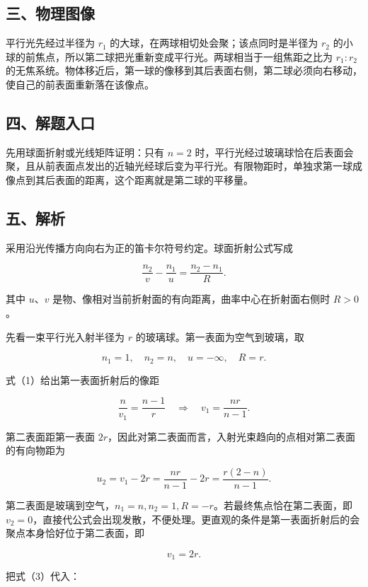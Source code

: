 \documentclass[12pt,a4paper,UTF8]{ctexart}
\begin{document}
\subsection{三、物理图像}\label{ux4e09ux7269ux7406ux56feux50cf-3}

平行光先经过半径为 \(r_1\) 的大球，在两球相切处会聚；该点同时是半径为
\(r_2\)
的小球的前焦点，所以第二球把光重新变成平行光。两球相当于一组焦距之比为
\(r_1:r_2\)
的无焦系统。物体移近后，第一球的像移到其后表面右侧，第二球必须向右移动，使自己的前表面重新落在该像点。

\subsection{四、解题入口}\label{ux56dbux89e3ux9898ux5165ux53e3-3}

先用球面折射或光线矩阵证明：只有 \(n=2\)
时，平行光经过玻璃球恰在后表面会聚，且从前表面点发出的近轴光经球后变为平行光。有限物距时，单独求第一球成像点到其后表面的距离，这个距离就是第二球的平移量。

\subsection{五、解析}\label{ux4e94ux89e3ux6790-3}

采用沿光传播方向向右为正的笛卡尔符号约定。球面折射公式写成

\[
\frac{n_2}{v}-\frac{n_1}{u}
=\frac{n_2-n_1}{R}. \tag{1}
\]

其中 \(u\)、\(v\)
是物、像相对当前折射面的有向距离，曲率中心在折射面右侧时 \(R>0\)。

先看一束平行光入射半径为 \(r\) 的玻璃球。第一表面为空气到玻璃，取

\[
n_1=1,\quad n_2=n,\quad u=-\infty,\quad R=r. \tag{2}
\]

式（1）给出第一表面折射后的像距

\[
\frac{n}{v_1}=\frac{n-1}{r}
\quad\Longrightarrow\quad
v_1=\frac{nr}{n-1}. \tag{3}
\]

第二表面距第一表面
\(2r\)，因此对第二表面而言，入射光束趋向的点相对第二表面的有向物距为

\[
u_2=v_1-2r
=\frac{nr}{n-1}-2r
=\frac{r(2-n)}{n-1}. \tag{4}
\]

第二表面是玻璃到空气，\(n_1=n,n_2=1,R=-r\)。若最终焦点恰在第二表面，即
\(v_2=0\)，直接代公式会出现发散，不便处理。更直观的条件是第一表面折射后的会聚点本身恰好位于第二表面，即

\[
v_1=2r. \tag{5}
\]

把式（3）代入：
\end{document}
